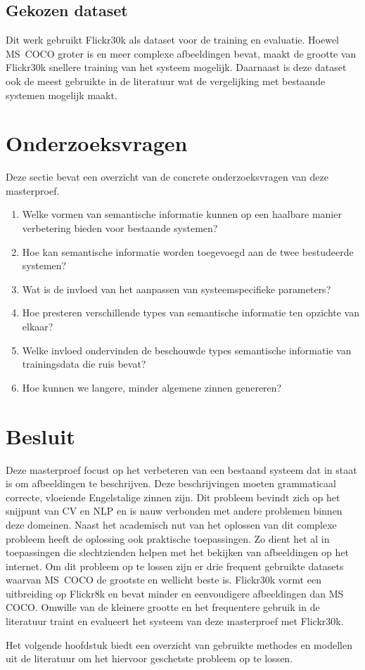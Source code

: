 \subsection{Gekozen dataset}
Dit werk gebruikt Flickr30k als dataset voor de training en evaluatie. Hoewel \mbox{MS COCO} groter is en meer complexe afbeeldingen bevat, maakt de grootte van Flickr30k snellere training van het systeem mogelijk. Daarnaast is deze dataset ook de meest gebruikte in de literatuur wat de vergelijking met bestaande systemen mogelijk maakt. 

\section{Onderzoeksvragen}
Deze sectie bevat een overzicht van de concrete onderzoeksvragen van deze masterproef.
\begin{enumerate}
	\item Welke vormen van semantische informatie kunnen op een haalbare manier verbetering bieden voor bestaande systemen? 
	\item Hoe kan semantische informatie worden toegevoegd aan de twee bestudeerde systemen?
	\item Wat is de invloed van het aanpassen van systeemspecifieke parameters? 
	\item Hoe presteren verschillende types van semantische informatie ten opzichte van elkaar? 
	\item Welke invloed ondervinden de beschouwde types semantische informatie van trainingsdata die ruis bevat?
	\item Hoe kunnen we langere, minder algemene zinnen genereren? 
\end{enumerate}

\section{Besluit}
Deze masterproef focust op het verbeteren van een bestaand systeem dat in staat is om afbeeldingen te beschrijven. Deze beschrijvingen moeten grammaticaal correcte, vloeiende Engelstalige zinnen zijn. Dit probleem bevindt zich op het snijpunt van CV en NLP en is nauw verbonden met andere problemen binnen deze domeinen. Naast het academisch nut van het oplossen van dit complexe probleem heeft de oplossing ook praktische toepassingen. Zo dient het al in toepassingen die slechtzienden helpen met het bekijken van afbeeldingen op het internet. Om dit probleem op te lossen zijn er drie frequent gebruikte datasets waarvan \mbox{MS COCO} de grootste en wellicht beste is. Flickr30k vormt een uitbreiding op Flickr8k en bevat minder en eenvoudigere afbeeldingen dan MS COCO. Omwille van de kleinere grootte en het frequentere gebruik in de literatuur traint en evalueert het systeem van deze masterproef met Flickr30k. 

Het volgende hoofdstuk biedt een overzicht van gebruikte methodes en modellen uit de literatuur om het hiervoor geschetste probleem op te lossen.
